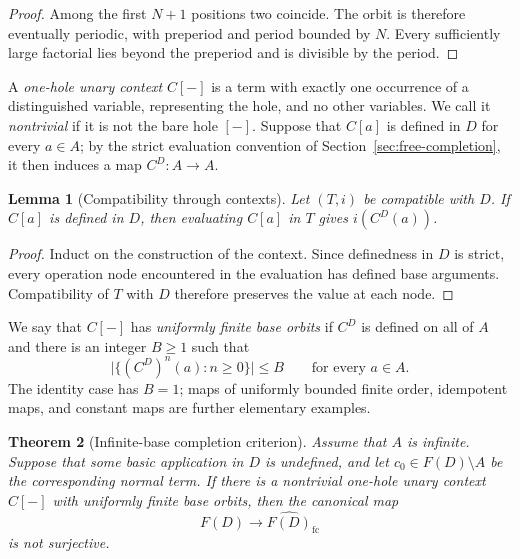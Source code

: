 \documentclass{birkau}
\newtheorem{theorem}{Theorem}[section]
\newtheorem{lemma}[theorem]{Lemma}
\theoremstyle{definition}
\theoremstyle{remark}
\begin{document}
\begin{proof}
Among the first $N+1$ positions two coincide.  The orbit is therefore eventually
periodic, with preperiod and period bounded by $N$.  Every sufficiently large
factorial lies beyond the preperiod and is divisible by the period.
\end{proof}

A \emph{one-hole unary context} $C[-]$ is a term with exactly one occurrence of
a distinguished variable, representing the hole, and no other variables.  We
call it \emph{nontrivial} if it is not the bare hole $[-]$.  Suppose that
$C[a]$ is defined in $D$ for every $a\in A$; by the strict evaluation
convention of Section~\ref{sec:free-completion}, it then induces a map
$C^D:A\to A$.

\begin{lemma}[Compatibility through contexts]\label{lem:context-compatibility}
Let $(T,i)$ be compatible with $D$.  If $C[a]$ is defined in $D$, then
evaluating $C[a]$ in $T$ gives $i(C^D(a))$.
\end{lemma}

\begin{proof}
Induct on the construction of the context.  Since definedness in $D$ is strict,
every operation node encountered in the evaluation has defined base arguments.
Compatibility of $T$ with $D$ therefore preserves the value at each node.
\end{proof}

We say that $C[-]$ has \emph{uniformly finite base orbits} if $C^D$ is defined
on all of $A$ and there is an integer $B\ge1$ such that
\[
 \bigl|\{(C^D)^n(a):n\ge0\}\bigr|\le B
 \qquad\text{for every }a\in A.
\]
The identity case has $B=1$; maps of uniformly bounded finite order,
idempotent maps, and constant maps are further elementary examples.

\begin{theorem}[Infinite-base completion criterion]
\label{thm:infinite-base-criterion}
Assume that $A$ is infinite.  Suppose that some basic application in $D$ is
undefined, and let $c_0\in F(D)\setminus A$ be the corresponding normal term.
If there is a nontrivial one-hole unary context $C[-]$ with uniformly finite
base orbits, then the canonical map
\[
 F(D)\longrightarrow\widehat{F(D)}_{\mathrm{fc}}
\]
is not surjective.
\end{theorem}
\end{document}
